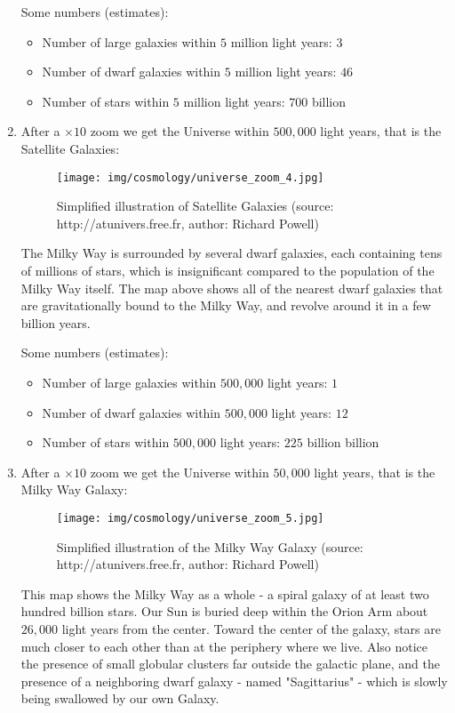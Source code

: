 \begin{enumerate}
		Some numbers (estimates):
		\begin{itemize}
			\item Number of large galaxies within $5$ million light years: $3$
			\item Number of dwarf galaxies within $5$ million light years: $46$
			\item Number of stars within $5$ million light years: $700$ billion
		\end{itemize}
		
		\item After a $\times 10$ zoom we get the Universe within $500,000$ light years, that is the Satellite Galaxies:
		\begin{figure}[H]
			\centering
			\texttt{[image: img/cosmology/universe\_zoom\_4.jpg]}
			\caption{Simplified illustration of Satellite Galaxies (source: http://atunivers.free.fr, author: Richard Powell)}
		\end{figure}
		The Milky Way is surrounded by several dwarf galaxies, each containing tens of millions of stars, which is insignificant compared to the population of the Milky Way itself. The map above shows all of the nearest dwarf galaxies that are gravitationally bound to the Milky Way, and revolve around it in a few billion years.
		
		Some numbers (estimates):
		\begin{itemize}
			\item Number of large galaxies within $500,000$ light years: $1$
			\item Number of dwarf galaxies within $500,000$ light years: $12$
			\item Number of stars within $500,000$ light years: $225$ billion billion
		\end{itemize}
		
		\item After a $\times 10$ zoom we get the Universe within $50,000$ light years, that is the Milky Way Galaxy:
		\begin{figure}[H]
			\centering
			\texttt{[image: img/cosmology/universe\_zoom\_5.jpg]}
			\caption{Simplified illustration of the Milky Way Galaxy (source: http://atunivers.free.fr, author: Richard Powell)}
		\end{figure}
		This map shows the Milky Way as a whole - a spiral galaxy of at least two hundred billion stars. Our Sun is buried deep within the Orion Arm about $26,000$ light years from the center. Toward the center of the galaxy, stars are much closer to each other than at the periphery where we live. Also notice the presence of small globular clusters far outside the galactic plane, and the presence of a neighboring dwarf galaxy - named "Sagittarius" - which is slowly being swallowed by our own Galaxy.
		

\end{enumerate}
